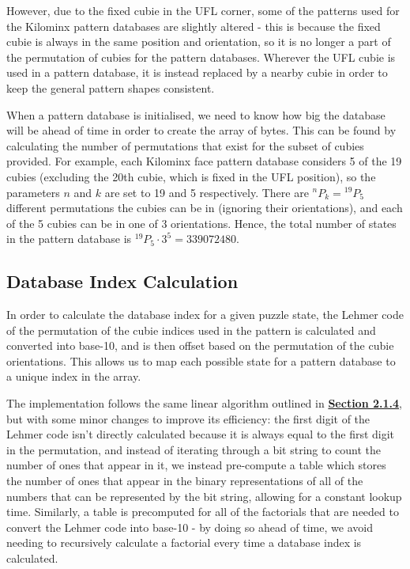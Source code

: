 However, due to the fixed cubie in the UFL corner, some of the patterns used for the Kilominx pattern databases are slightly altered - this is because the fixed cubie is always in the same position and orientation, so it is no longer a part of the permutation of cubies for the pattern databases. Wherever the UFL cubie is used in a pattern database, it is instead replaced by a nearby cubie in order to keep the general pattern shapes consistent.

When a pattern database is initialised, we need to know how big the database will be ahead of time in order to create the array of bytes. This can be found by calculating the number of permutations that exist for the subset of cubies provided. For example, each Kilominx face pattern database considers 5 of the 19 cubies (excluding the 20th cubie, which is fixed in the UFL position), so the parameters $n$ and $k$ are set to 19 and 5 respectively. There are $^nP_k = {}^{19}P_5$ different permutations the cubies can be in (ignoring their orientations), and each of the 5 cubies can be in one of 3 orientations. Hence, the total number of states in the pattern database is $^{19}P_5 \cdot 3^5 = 339072480$.

\subsection{Database Index Calculation}
In order to calculate the database index for a given puzzle state, the Lehmer code of the permutation of the cubie indices used in the pattern is calculated and converted into base-10, and is then offset based on the permutation of the cubie orientations. This allows us to map each possible state for a pattern database to a unique index in the array.

The implementation follows the same linear algorithm outlined in \textbf{\hyperref[subsection:lehmercodes]{Section 2.1.4}}, but with some minor changes to improve its efficiency: the first digit of the Lehmer code isn't directly calculated because it is always equal to the first digit in the permutation, and instead of iterating through a bit string to count the number of ones that appear in it, we instead pre-compute a table which stores the number of ones that appear in the binary representations of all of the numbers that can be represented by the bit string, allowing for a constant lookup time. Similarly, a table is precomputed for all of the factorials that are needed to convert the Lehmer code into base-10 - by doing so ahead of time, we avoid needing to recursively calculate a factorial every time a database index is calculated.

